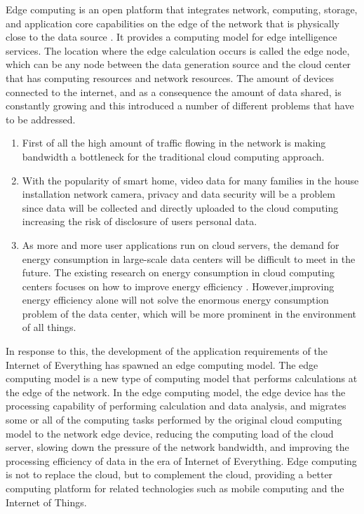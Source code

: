 Edge computing \cite{Edge} is an open platform that integrates network, computing, storage, and application core
capabilities on the edge of the network that is physically close to the data source \cite{Edge2}. It provides
a computing model for edge intelligence services. The location where the edge calculation occurs is
called the edge node, which can be any node between the data generation source and the cloud center
that has computing resources and network resources. The amount of devices connected to the
internet, and as a consequence the amount of data shared, is constantly \cite{DataGrowth} growing and this introduced
a number of different problems that have to be addressed.
\\
\begin{enumerate}
        \item First of all the high amount of traffic flowing in the network is making bandwidth a
              bottleneck for the traditional cloud computing approach.

        \item With the popularity of smart home, video data for many families in the house installation
              network camera, privacy and data security will be a problem since data will be collected
              and directly uploaded to the cloud computing increasing the risk of disclosure of users
              personal data.

        \item As more and more user applications run on cloud servers, the demand for energy consumption
              in large-scale data centers will be difficult to meet in the future. The existing research on
              energy consumption in cloud computing centers focuses on how to improve energy efficiency \cite{EnEff}.
              However,improving energy efficiency alone will not solve the enormous energy consumption
              problem of the data center, which will be more prominent in the environment of all things.
\end{enumerate}

In response to this, the development of the application requirements of the Internet of Everything has
spawned an edge computing model. The edge computing model is a new type of computing model that performs
calculations at the edge of the network. In the edge computing model, the edge device has the processing
capability of performing calculation and data analysis, and migrates some or all of the computing tasks
performed by the original cloud computing model to the network edge device, reducing the computing load
of the cloud server, slowing down the pressure of the network bandwidth, and improving the processing
efficiency of data in the era of Internet of Everything. Edge computing is not to replace the cloud,
but to complement the cloud, providing a better computing platform for related technologies such as mobile
computing and the Internet of Things.

